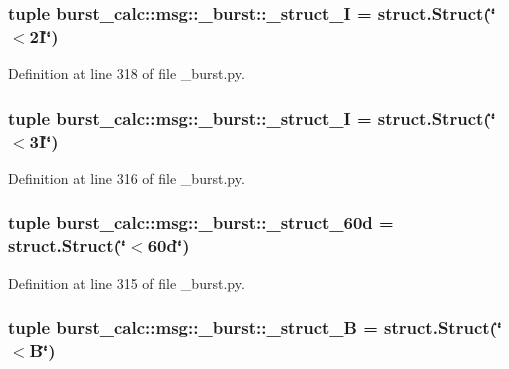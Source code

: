\subsubsection[{\-\_\-struct\-\_\-2\-I}]{\setlength{\rightskip}{0pt plus 5cm}tuple {\bf burst\-\_\-calc\-::msg\-::\-\_\-burst\-::\-\_\-struct\-\_\-I} = struct.\-Struct(\char`\"{}$<$2\-I\char`\"{})}\label{namespaceburst__calc_1_1msg_1_1__burst_a9eebcd9cd82b45d4ad76061298433c67}


\-Definition at line 318 of file \-\_\-burst.\-py.

\subsubsection[{\-\_\-struct\-\_\-3\-I}]{\setlength{\rightskip}{0pt plus 5cm}tuple {\bf burst\-\_\-calc\-::msg\-::\-\_\-burst\-::\-\_\-struct\-\_\-I} = struct.\-Struct(\char`\"{}$<$3\-I\char`\"{})}\label{namespaceburst__calc_1_1msg_1_1__burst_ad324276dcec25cd6ac895ca1d1598129}


\-Definition at line 316 of file \-\_\-burst.\-py.

\subsubsection[{\-\_\-struct\-\_\-60d}]{\setlength{\rightskip}{0pt plus 5cm}tuple {\bf burst\-\_\-calc\-::msg\-::\-\_\-burst\-::\-\_\-struct\-\_\-60d} = struct.\-Struct(\char`\"{}$<$60d\char`\"{})}\label{namespaceburst__calc_1_1msg_1_1__burst_a4e354738dd3220b820e7b948ea93a675}


\-Definition at line 315 of file \-\_\-burst.\-py.

\subsubsection[{\-\_\-struct\-\_\-\-B}]{\setlength{\rightskip}{0pt plus 5cm}tuple {\bf burst\-\_\-calc\-::msg\-::\-\_\-burst\-::\-\_\-struct\-\_\-\-B} = struct.\-Struct(\char`\"{}$<$\-B\char`\"{})}\label{namespaceburst__calc_1_1msg_1_1__burst_a7548d84d3c704efdae60e9fb6a90947c}



